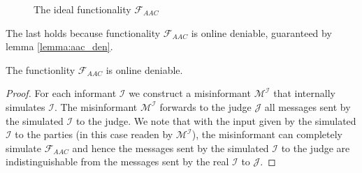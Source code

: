 \documentclass{acm_proc_article-sp}
\begin{document}
\begin{figure}
\caption{The ideal functionality $\mathcal{F}_{AAC}$}
\label{func:F_AAC}
\end{figure}

The last holds because functionality $\mathcal{F}_{AAC}$ is online deniable, guaranteed by lemma
\ref{lemma:aac_den}.

\begin{lemma}
The functionlity $\mathcal{F}_{AAC}$ is online deniable.
\label{lemma:aac_den}
\end{lemma}

\begin{proof}
For each informant $\mathcal{I}$ we construct a misinformant $\mathcal{M^I}$ that internally
simulates $\mathcal{I}$. The misinformant $\mathcal{M^I}$ forwards to the judge $\mathcal{J}$
all messages sent by the simulated $\mathcal{I}$ to the judge. We note
that with the input given by the simulated $\mathcal{I}$ to the parties (in this case readen
by $\mathcal{M^I}$), the misinformant can completely simulate $\mathcal{F}_{AAC}$ and hence
the messages sent by the simulated $\mathcal{I}$ to the judge are indistinguishable from
the messages sent by the real $\mathcal{I}$ to $\mathcal{J}$.
\end{proof}
\end{document}
